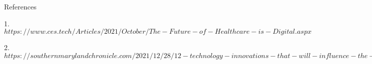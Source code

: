 \documentclass[12pt]{article}
\begin{document}
\clearpage

\begin{Large}
References
\end{Large}

\bigskip

1. $https://www.ces.tech/Articles/2021/October/The-Future-of-Healthcare-is-Digital.aspx$
\linebreak
\linebreak

2. $https://southernmarylandchronicle.com/2021/12/28/12-technology-innovations-that-will-influence-the-future-of-healthcare/$
\end{document}
